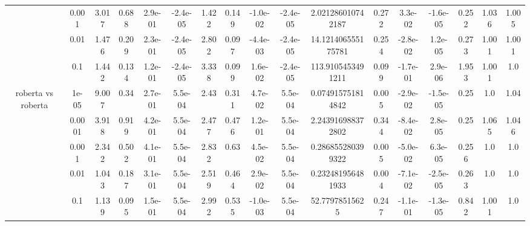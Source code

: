 \begin{tabular}{|c|c|c|c|c|c|c|c|c|c|c|c|c|c|c|c|c|}
 & 0.001 & 3.017 & 0.688 & 2.9e-01 & -2.4e-05 & 1.422 & 0.149 & -1.0e-02 & -2.4e-05 & 2.021286010742187 & 0.272 & 3.3e-02 & -1.6e-05 & 0.252 & 1.036 & 1.005 \\
 & 0.01 & 1.476 & 0.209 & 2.3e-01 & -2.4e-05 & 2.802 & 0.097 & -4.4e-03 & -2.4e-05 & 14.121406555175781 & 0.254 & -2.8e-02 & 1.2e-05 & 0.273 & 1.001 & 1.001 \\
 & 0.1 & 1.442 & 0.134 & 1.2e-01 & -2.4e-05 & 3.338 & 0.099 & 1.6e-02 & -2.4e-05 & 113.9105453491211 & 0.099 & -1.7e-01 & 2.9e-06 & 1.953 & 1.001 & 1.0 \\
\hline
\multirow{5}{*}{roberta  vs roberta } & 1e-05 & 9.007 & 0.34 & 2.7e-01 & 5.5e-04 & 2.43 & 0.311 & 4.7e-02 & 5.5e-04 & 0.074915751814842 & 0.005 & -2.9e-02 & -1.5e-05 & 0.25 & 1.0 & 1.04 \\
 & 0.0001 & 3.918 & 0.919 & 4.2e-01 & 5.5e-04 & 2.477 & 0.476 & 1.2e-01 & 5.5e-04 & 2.243916988372802 & 0.344 & -8.4e-02 & 2.8e-05 & 0.25 & 1.065 & 1.046 \\
 & 0.001 & 2.342 & 0.502 & 4.1e-01 & 5.5e-04 & 2.832 & 0.63 & 4.5e-02 & 5.5e-04 & 0.286855280399322 & 0.005 & -5.0e-02 & 6.3e-05 & 0.256 & 1.0 & 1.0 \\
 & 0.01 & 1.043 & 0.187 & 3.1e-01 & 5.5e-04 & 2.519 & 0.464 & 2.9e-02 & 5.5e-04 & 0.232481956481933 & 0.004 & -7.1e-02 & -2.5e-05 & 0.263 & 1.0 & 1.0 \\
 & 0.1 & 1.139 & 0.095 & 1.5e-01 & 5.5e-04 & 2.992 & 0.535 & -1.0e-03 & 5.5e-04 & 52.77978515625 & 0.247 & -1.1e-01 & -1.3e-05 & 0.842 & 1.001 & 1.0 \\
\hline
\end{tabular}